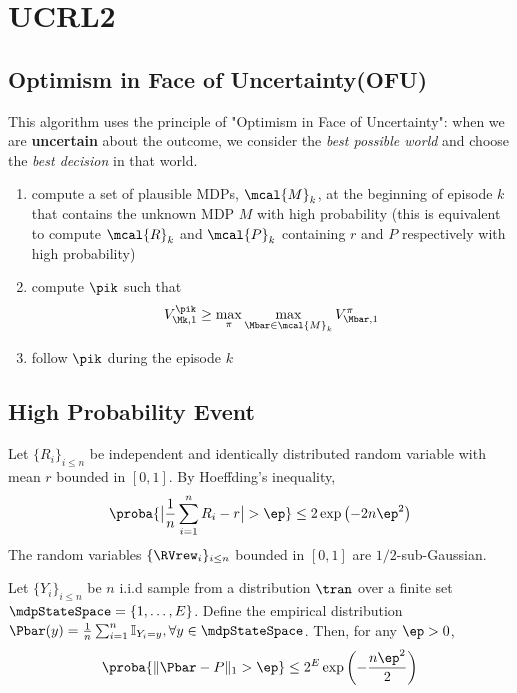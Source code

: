 \section{UCRL2}
\label{sec:ucrl2}

\subsection{Optimism in Face of Uncertainty(OFU)}
\label{subsec:OFU}

This algorithm uses the principle of "Optimism in Face of Uncertainty": when we are \textbf{uncertain} about the outcome, we consider the \textit{best possible world} and choose the \textit{best decision} in that world.

\begin{enumerate}
\item compute a set of plausible MDPs, $\mcal{M}_k$, at the beginning of episode $k$ that contains the unknown MDP $M$ with high probability (this is equivalent to compute $\mcal{R}_k$ and $\mcal{P}_k$ containing $r$ and $P$ respectively with high probability)
\item compute $\pik$ such that
\begin{align}
V_{\Mk,1}^{\pik} \ge \max_{\pi}\max_{\Mbar\in\mcal{M}_k} V_{\Mbar,1}^\pi
\end{align}
\item follow $\pik$ during the episode $k$
\end{enumerate}

\subsection{High Probability Event}
\label{subsec:high_prob_event}

\begin{thm}
\label{thm:hoeffding}
Let $\{R_i\}_{i\le n}$ be independent and identically distributed random variable with mean $r$ bounded in $[0,1]$.
By Hoeffding's inequality,
\begin{align*}
\proba{\big\vert\frac{1}{n}\sum_{i=1}^nR_i-r\big\vert>\ep}\le2\exp\left(-2n\ep^2\right)
\end{align*}
The random variables $\{\RVrew_i\}_{i\le n}$ bounded in $[0,1]$ are $1/2$-sub-Gaussian.
\end{thm}

\begin{thm}
\label{thm:weissman}
Let $\{Y_i\}_{i\le n}$ be $n$ i.i.d sample from a distribution $\tran$ over a finite set $\mdpStateSpace=\{1,\dots,E\}$. Define the empirical distribution $\Pbar(y)=\frac{1}{n}\sum_{i=1}^{n}\mathbb{I}_{Y_i=y}, \forall y\in\mdpStateSpace$. Then, for any $\ep>0$,
\begin{align*}
\proba{\Vert\Pbar-P\Vert_1> \ep} \le 2^E\exp\left(-\frac{n\ep^2}{2}\right)
\end{align*}
\end{thm}

